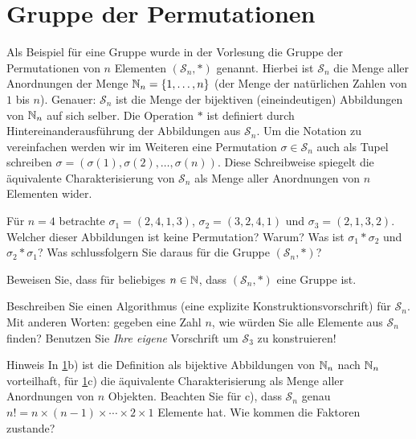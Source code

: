 \documentclass{scrartcl}
\newcommand{\permN}{\mathcal{S}_n}
\begin{document}
\maketitle

\section{Gruppe der Permutationen}
\label{groupperm}
Als Beispiel für eine Gruppe wurde in der Vorlesung die Gruppe der Permutationen von $n$ Elementen $(\permN{}, \ast)$ genannt.
Hierbei ist $\permN$ die Menge aller Anordnungen der Menge $\mathbb{N}_n = \{1,\ldots,n\}$ (der Menge der natürlichen Zahlen von $1$ bis $n$).
Genauer: $\permN$ ist die Menge der bijektiven (eineindeutigen) Abbildungen von $\mathbb{N}_n$ auf sich selber.
Die Operation $\ast$ ist definiert durch Hintereinanderausführung der Abbildungen aus $\permN$.
Um die Notation zu vereinfachen werden wir im Weiteren eine Permutation $\sigma \in \permN$ auch als Tupel schreiben $\sigma = (\sigma(1), \sigma(2), \ldots, \sigma(n))$.
Diese Schreibweise spiegelt die äquivalente Charakterisierung von $\permN$ als Menge aller Anordnungen von $n$ Elementen wider.
\begin{subex} 
  \item Für $n=4$ betrachte $\sigma_1 = (2, 4, 1, 3)$, $\sigma_2 = (3, 2, 4 , 1)$ und $\sigma_3 = (2, 1, 3, 2)$.
  Welcher dieser Abbildungen ist keine Permutation?
  Warum?
  Was ist $\sigma_1 \ast \sigma_2$ und $\sigma_2 \ast \sigma_1$?
  Was schlussfolgern Sie daraus für die Gruppe $(\permN,\ast)$?
  \item Beweisen Sie, dass für beliebiges $n \in \mathbb{N}$, dass $(\permN,\ast)$ eine Gruppe ist.
  \item Beschreiben Sie einen Algorithmus (eine explizite Konstruktionsvorschrift) für $\permN$.
  Mit anderen Worten: gegeben eine Zahl $n$, wie würden Sie alle Elemente aus $\permN$ finden?
  Benutzen Sie \emph{Ihre eigene} Vorschrift um $\mathcal{S}_3$ zu konstruieren!
\end{subex}
\begin{remark}{Hinweis}
  In \ref{groupperm}b) ist die Definition als bijektive Abbildungen von $\mathbb{N}_n$ nach $\mathbb{N}_n$ vorteilhaft, für  \ref{groupperm}c) die äquivalente Charakterisierung als Menge aller Anordnungen von $n$ Objekten.
  Beachten Sie für c), dass $\permN$ genau $n! = n \times (n-1) \times \cdots \times 2 \times 1$ Elemente hat.
  Wie kommen die Faktoren zustande?
\end{remark}
\end{document}
